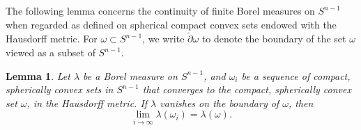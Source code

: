 \documentclass{cpamart1}     %
\newtheorem{lemm}[theo]{Lemma}
\theoremstyle{definition}
\theoremstyle{remark}
\newcommand{\sn}{S^{n-1}}
\begin{document}
The following lemma concerns the continuity of finite Borel measures on $\sn$
when regarded as defined on spherical compact convex sets endowed with the Hausdorff metric.
For $\omega\subset\sn$, we write $\tilde{\partial} \omega$ to denote the boundary
 of the set $\omega$ viewed as a subset of $S^{n-1}$.


\begin{lemm}
\label{b1}
Let $\lambda$ be a Borel measure on $S^{n-1}$, and
 $\omega_i$ be a sequence of compact, spherically convex sets in $S^{n-1}$
 that converges to the compact, spherically convex set $\omega$,
 in the Hausdorff metric. If $\lambda$ vanishes on the boundary
of $\omega$, then
\begin{equation*}
\lim_{i\rightarrow \infty}\lambda(\omega_i)= \lambda(\omega).
\end{equation*}
\end{lemm}
\end{document}
